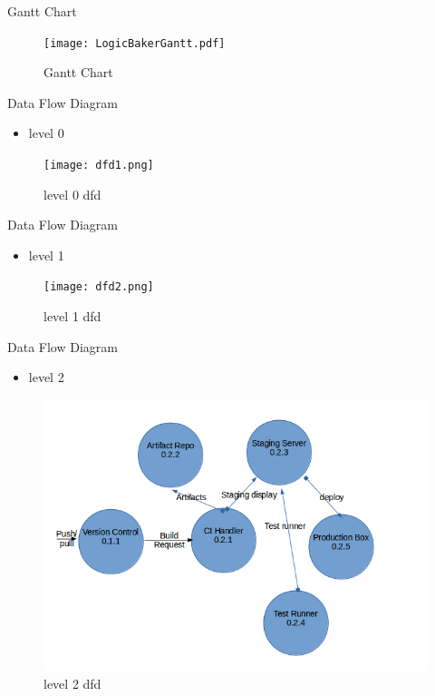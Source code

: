\documentclass{beamer}
\begin{document}
\begin{frame}{Gantt Chart}
\begin{figure}[h]
\begin{center}
\texttt{[image: LogicBakerGantt.pdf]}
\caption{Gantt Chart}
\end{center}
\end{figure}
\end{frame}

\begin{frame}{Data Flow Diagram}
\begin{itemize}
\item level 0
\end{itemize}
\begin{figure}[h]
\begin{center}
\texttt{[image: dfd1.png]}
\caption{level 0 dfd}
\end{center}
\end{figure}
\end{frame}

\begin{frame}{Data Flow Diagram}
\begin{itemize}
\item level 1
\end{itemize}
\begin{figure}[h]
\begin{center}
\texttt{[image: dfd2.png]}
\caption{level 1 dfd}
\end{center}
\end{figure}
\end{frame}

\begin{frame}{Data Flow Diagram}
\begin{itemize}
\item level 2
\end{itemize}
\begin{figure}[h]
\begin{center}
\includegraphics[scale=0.28]{dfd3.png}
\caption{level 2 dfd}
\end{center}
\end{figure}
\end{frame}
\end{document}
